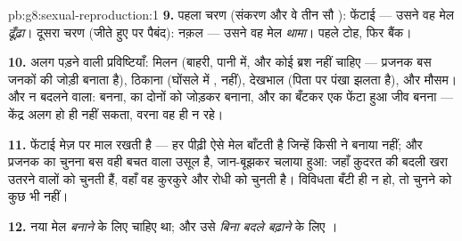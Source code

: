 \begin{solution}{pb:g8:sexual-reproduction:1}
\textbf{9.} पहला चरण (संकरण और वे तीन सौ ): फेंटाई --- उसने वह मेल
\emph{ढूँढ़ा}। दूसरा चरण (जीते हुए पर पैबंद): नक़ल --- उसने वह मेल
\emph{थामा}। पहले टोह, फिर बैंक।

\textbf{10.} अलग पड़ने वाली प्रविष्टियाँ: मिलन (बाहरी, पानी में, और
कोई ब्रश नहीं चाहिए --- प्रजनक बस जनकों की जोड़ी बनाता है), ठिकाना
(घोंसले में ,  नहीं), देखभाल (पिता  पर पंखा झलता है), और
मौसम। और न बदलने वाला:  बनना,  का दोनों को जोड़कर 
बनाना, और  का बँटकर एक फेंटा हुआ जीव बनना --- केंद्र अलग हो ही
नहीं सकता, वरना वह  ही न रहे।

\textbf{11.} फेंटाई मेज़ पर माल रखती है --- हर पीढ़ी ऐसे मेल बाँटती है
जिन्हें किसी ने बनाया नहीं; और प्रजनक का चुनना बस वही बचत वाला उसूल है,
जान-बूझकर चलाया हुआ: जहाँ क़ुदरत की बदली  खरा उतरने वालों
को चुनती हैं, वहाँ वह कुरकुरे और रोधी को चुनती है। विविधता बँटी ही न
हो, तो चुनने को कुछ भी नहीं।

\textbf{12.} नया मेल \emph{बनाने} के लिए  चाहिए था; और उसे
\emph{बिना बदले बढ़ाने} के लिए ।
\end{solution}
